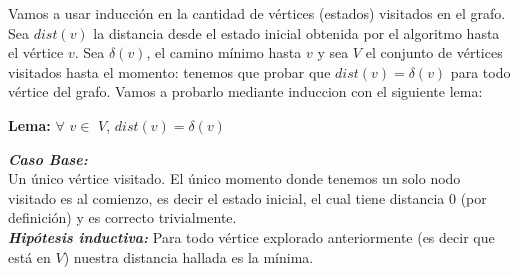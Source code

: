 Vamos a usar inducción en la cantidad de vértices (estados) visitados en el grafo.
Sea $dist(v)$ la distancia desde el estado inicial obtenida por el algoritmo hasta el vértice $v$. Sea $\delta(v)$, el camino mínimo hasta $v$ y sea $V$ el conjunto de vértices visitados hasta el momento: tenemos que probar que $dist(v) = \delta(v)$ para todo vértice del grafo. Vamos a probarlo mediante induccion con el siguiente lema:
\\


\begin{center}
\textbf{Lema: } $\forall$ $v \in$ $V$, $dist(v) = \delta(v)$
\end{center}

\emph{\textbf{Caso Base:}}
\\

Un único vértice visitado. El único momento donde tenemos un solo nodo visitado es al comienzo, es decir
el estado inicial, el cual tiene distancia 0 (por definición) y es correcto trivialmente.
\\

\emph{\textbf{Hipótesis inductiva: }} Para todo vértice explorado anteriormente (es decir que está en $V$) nuestra distancia hallada es la mínima.
\\

